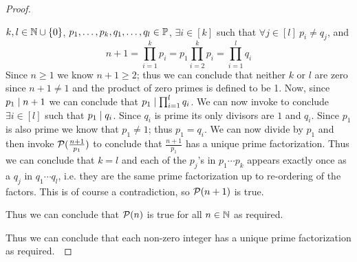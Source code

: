 \begin{proof}
\begin{enumerate}
\begin{itemize}
                            $k, l \in \mathbb{N} \cup \left\{0\right\}$, $p_1, \dots, p_k, q_1, \dots, q_l \in \mathbb{P}$,
                            $\exists i \in [k]$ such that $\forall j \in [l] \ p_i \neq q_j$, and
                            \begin{equation}
                                n + 1 = \prod_{i = 1}^{k} p_i = p_1 \prod_{i = 2}^{k} p_i = \prod_{i = 1}^{l} q_i
                                \label{FTA equation 1}
                            \end{equation}
                            Since $n \ge 1$ we know $n + 1 \ge 2$; thus we can conclude that neither
                            $k$ or $l$ are zero since $n + 1 \neq 1$ and the product of zero primes
                            is defined to be 1. Now, since $p_1 \mid n + 1$ we can conclude
                            that $p_1 \mid \prod_{i = 1}^{l} q_i$. We can now invoke
                             to conclude $\exists i \in [l]$ such that $p_1 \mid q_i$.
                            Since $q_i$ is prime its only divisors are $1$ and $q_i$. Since $p_1$
                            is also prime we know that $p_1 \neq 1$; thus $p_1 = q_i$.
                            We can now divide  by $p_1$ and then
                            invoke $\mathcal{P}(\frac{n + 1}{p_1})$ to conclude that $\frac{n + 1}{p_1}$
                            has a unique prime factorization. Thus
                            we can conclude that $k = l$ and each of the $p_j$'s in
                            $p_1 \cdots p_k$ appears exactly once as a $q_j$ in $q_1 \cdots q_l$,
                            i.e. they are the same prime factorization up to re-ordering of the factors.
                            This is of course a contradiction, so $\mathcal{P}(n + 1)$ is true.
                    \end{itemize}
                    Thus we can conclude that $\mathcal{P}(n)$ is true for all $n \in \mathbb{N}$
                    as required.
            \end{enumerate}
            Thus we can conclude that each non-zero integer has a unique prime
            factorization as required.~\QED
        \end{proof}
